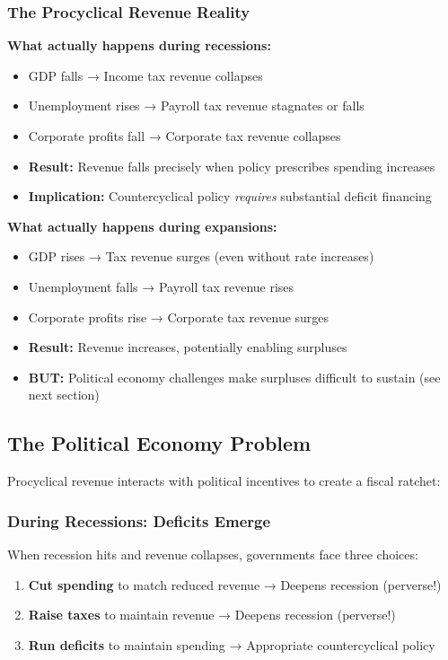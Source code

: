 \documentclass[12pt,letterpaper]{article}
\begin{document}
\subsubsection{The Procyclical Revenue Reality}

\textbf{What actually happens during recessions:}
\begin{itemize}
    \item GDP falls → Income tax revenue collapses
    \item Unemployment rises → Payroll tax revenue stagnates or falls
    \item Corporate profits fall → Corporate tax revenue collapses
    \item \textbf{Result:} Revenue falls precisely when policy prescribes spending increases
    \item \textbf{Implication:} Countercyclical policy \textit{requires} substantial deficit financing
\end{itemize}

\textbf{What actually happens during expansions:}
\begin{itemize}
    \item GDP rises → Tax revenue surges (even without rate increases)
    \item Unemployment falls → Payroll tax revenue rises
    \item Corporate profits rise → Corporate tax revenue surges
    \item \textbf{Result:} Revenue increases, potentially enabling surpluses
    \item \textbf{BUT:} Political economy challenges make surpluses difficult to sustain (see next section)
\end{itemize}

\subsection{The Political Economy Problem}

Procyclical revenue interacts with political incentives to create a fiscal ratchet:

\subsubsection{During Recessions: Deficits Emerge}

When recession hits and revenue collapses, governments face three choices:
\begin{enumerate}
    \item \textbf{Cut spending} to match reduced revenue → Deepens recession (perverse!)
    \item \textbf{Raise taxes} to maintain revenue → Deepens recession (perverse!)
    \item \textbf{Run deficits} to maintain spending → Appropriate countercyclical policy
\end{enumerate}
\end{document}
